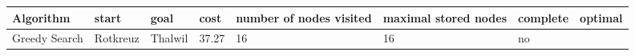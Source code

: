 \documentclass[11pt]{article}
\begin{document}
\begin{longtable}[]{@{}llllllll@{}}
\toprule
\begin{minipage}[b]{0.11\columnwidth}\raggedright
Algorithm\strut
\end{minipage} & \begin{minipage}[b]{0.11\columnwidth}\raggedright
start\strut
\end{minipage} & \begin{minipage}[b]{0.09\columnwidth}\raggedright
goal\strut
\end{minipage} & \begin{minipage}[b]{0.09\columnwidth}\raggedright
cost\strut
\end{minipage} & \begin{minipage}[b]{0.09\columnwidth}\raggedright
number of nodes visited\strut
\end{minipage} & \begin{minipage}[b]{0.09\columnwidth}\raggedright
maximal stored nodes\strut
\end{minipage} & \begin{minipage}[b]{0.09\columnwidth}\raggedright
complete\strut
\end{minipage} & \begin{minipage}[b]{0.09\columnwidth}\raggedright
optimal\strut
\end{minipage}\tabularnewline
\midrule
\endhead
\begin{minipage}[t]{0.11\columnwidth}\raggedright
Greedy Search\strut
\end{minipage} & \begin{minipage}[t]{0.11\columnwidth}\raggedright
Rotkreuz\strut
\end{minipage} & \begin{minipage}[t]{0.09\columnwidth}\raggedright
Thalwil\strut
\end{minipage} & \begin{minipage}[t]{0.09\columnwidth}\raggedright
37.27\strut
\end{minipage} & \begin{minipage}[t]{0.09\columnwidth}\raggedright
16\strut
\end{minipage} & \begin{minipage}[t]{0.09\columnwidth}\raggedright
16\strut
\end{minipage} & \begin{minipage}[t]{0.09\columnwidth}\raggedright
no\strut
\end{minipage} & \begin{minipage}[t]{0.09\columnwidth}\raggedright

\end{minipage}
\end{longtable}
\end{document}
